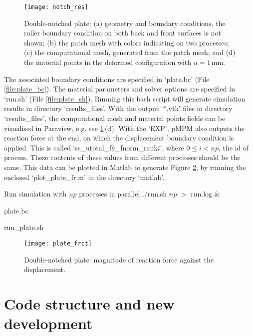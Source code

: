 \documentclass[10pt,a4paper]{article}
\begin{document}
\begin{figure}[!ht]
\centering
\texttt{[image: notch\_res]}
\caption{Double-notched plate: (a) geometry and boundary conditions, the roller boundary condition on both back and front surfaces is not shown; (b) the patch mesh with colors indicating on two processes; (c) the computational mesh, generated from the patch mesh; and (d) the material points in the deformed configuration with $u=1$\,mm.}
\label{fig:notch_res}
\end{figure}

The associated boundary conditions are specified in `plate.bc' (File \ref{file:plate_bc}). The material parameters and solver options are specified in `run.sh' (File \ref{file:plate_sh}). Running this bash script will generate simulation results in directory `results\_files'. With the output `*.vtk' files in directory `results\_files', the computational mesh and material points fields can be visualised in Paraview, e.g. see \ref{fig:notch_res}\,(d). With the `EXP', pMPM also outputs the reaction force at the end, on which the displacement boundary condition is applied. This is called `ss\_utotal\_fy\_fnorm\_rank$i$', where $0 \leqslant i < np$, the id of process. These contents of these values from different processes should be the same. This data can be plotted in Matlab to generate Figure \ref{fig:notch_fr}, by running the enclosed `plot\_plate\_fr.m' in the directory `matlab'.   

\begin{tip}[label=tip:prun]{Run simulation with $np$ processes in parallel}
./run.sh $np$ $>$ run.log \& 
\end{tip}


\begin{file}[label=file:plate_bc]{plate.bc}

\end{file}

\begin{file}[label=file:plate_sh]{run\_plate.sh}

\end{file}

\begin{figure}[!ht]
\centering
\texttt{[image: plate\_frct]}
\caption{Double-notched plate: magnitude of reaction force against the displacement.}
\label{fig:notch_fr}
\end{figure}




\section{Code structure and new development}
\label{ch:exe}
\end{document}
